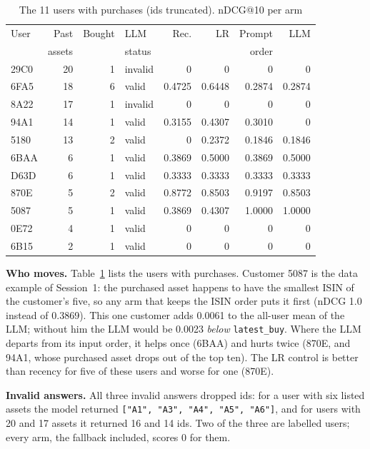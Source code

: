 \documentclass[conference]{IEEEtran}
\begin{document}
\begin{table}[t]
\caption{The 11 users with purchases (ids truncated). nDCG@10 per arm}
\label{tab:users}
\centering
\footnotesize
\setlength{\tabcolsep}{4pt}
\begin{tabular}{@{}lrrlrrrr@{}}
\toprule
User & Past & Bought & LLM & Rec. & LR & Prompt & LLM\\
 & assets & & status & & & order & \\
\midrule
29C0 & 20 & 1 & invalid & 0 & 0 & 0 & 0\\
6FA5 & 18 & 6 & valid & 0.4725 & 0.6448 & 0.2874 & 0.2874\\
8A22 & 17 & 1 & invalid & 0 & 0 & 0 & 0\\
94A1 & 14 & 1 & valid & 0.3155 & 0.4307 & 0.3010 & 0\\
5180 & 13 & 2 & valid & 0 & 0.2372 & 0.1846 & 0.1846\\
6BAA & 6 & 1 & valid & 0.3869 & 0.5000 & 0.3869 & 0.5000\\
D63D & 6 & 1 & valid & 0.3333 & 0.3333 & 0.3333 & 0.3333\\
870E & 5 & 2 & valid & 0.8772 & 0.8503 & 0.9197 & 0.8503\\
5087 & 5 & 1 & valid & 0.3869 & 0.4307 & 1.0000 & 1.0000\\
0E72 & 4 & 1 & valid & 0 & 0 & 0 & 0\\
6B15 & 2 & 1 & valid & 0 & 0 & 0 & 0\\
\bottomrule
\end{tabular}
\end{table}

\textbf{Who moves.} Table~\ref{tab:users} lists the users with purchases. Customer 5087 is the data example of Session~1: the purchased asset happens to have the smallest ISIN of the customer's five, so any arm that keeps the ISIN order puts it first (nDCG 1.0 instead of 0.3869). This one customer adds 0.0061 to the all-user mean of the LLM; without him the LLM would be 0.0023 \emph{below} \texttt{latest\_buy}. Where the LLM departs from its input order, it helps once (6BAA) and hurts twice (870E, and 94A1, whose purchased asset drops out of the top ten). The LR control is better than recency for five of these users and worse for one (870E).

\textbf{Invalid answers.} All three invalid answers dropped ids: for a user with six listed assets the model returned \texttt{["A1", "A3", "A4", "A5", "A6"]}, and for users with 20 and 17 assets it returned 16 and 14 ids. Two of the three are labelled users; every arm, the fallback included, scores 0 for them.
\end{document}
